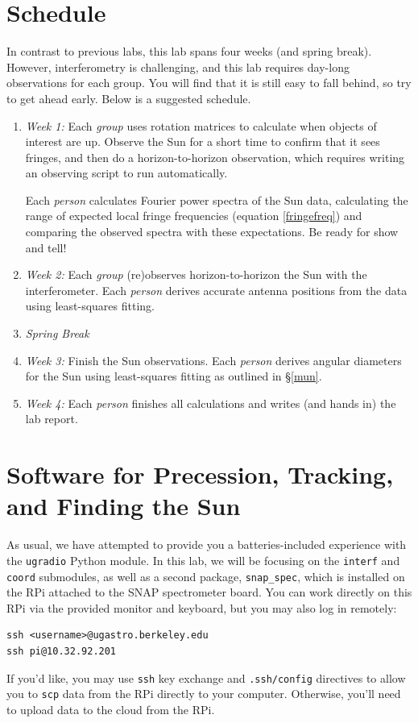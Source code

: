 \documentclass[11pt,preprint]{aastex}
\begin{document}
\section{Schedule}

\noindent
In contrast to previous labs, this lab spans four weeks (and spring break).
However, interferometry is challenging, and this lab requires day-long
observations for each group. You will find that it is still easy to fall
behind, so try to get ahead early. Below is a suggested schedule.

\begin{enumerate}

\item {\it Week 1:} Each {\it group} uses rotation
  matrices to calculate when objects of interest are up. Observe the
  Sun for a short time to confirm that it sees fringes,
  and then do a horizon-to-horizon observation, which
  requires writing an observing script to run automatically.

Each {\it person} calculates Fourier power spectra of the Sun data,
calculating the range of expected
local fringe frequencies (equation \ref{fringefreq}) and comparing the
observed spectra with these expectations. Be ready for show and tell!

\item {\it Week 2:} Each {\it group} (re)observes
  horizon-to-horizon the Sun with the
  interferometer.  Each {\it person} derives accurate antenna positions
  from the data using least-squares fitting.

\item {\it Spring Break}

\item {\it Week 3:} Finish the Sun observations.
  Each {\it person} derives angular diameters for the
  Sun using least-squares fitting as outlined in \S \ref{mun}.

\item {\it Week 4:} Each {\it person} finishes all
  calculations and writes (and hands in) the lab report.

\end{enumerate}

\section{Software for Precession, Tracking, and Finding the Sun}

\noindent
As usual, we have attempted to provide you a batteries-included experience with
the {\tt ugradio} Python module. In this lab, we will be focusing on the
{\tt interf} and {\tt coord} submodules, as well as a second package,
{\tt snap\_spec}, which is installed on the RPi attached to the SNAP spectrometer
board. You can work directly on this RPi via the provided monitor and keyboard,
but you may also log in remotely:
\begin{verbatim}
ssh <username>@ugastro.berkeley.edu
ssh pi@10.32.92.201
\end{verbatim}
If you'd like, you may use {\tt ssh} key exchange and {\tt .ssh/config} directives
to allow you to {\tt scp} data from the RPi directly to your computer. Otherwise,
you'll need to upload data to the cloud from the RPi.
\end{document}
